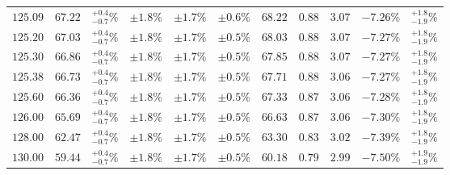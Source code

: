 \begin{table}[ht!]
{{\begin{tabular}{| cc | c | ccc | cccc | c |}
$125.09$ & $67.22$ & $^{+0.4}_{-0.7}\%$ & $\pm 1.8\%$ & {\color{black!55}$\pm 1.7\%$} & {\color{black!55}$\pm 0.6\%$} & $68.22$ & $0.88$ & $3.07$ & $-7.26\%$ & $^{+1.8}_{-1.9}\%$ \\
$125.20$ & $67.03$ & $^{+0.4}_{-0.7}\%$ & $\pm 1.8\%$ & {\color{black!55}$\pm 1.7\%$} & {\color{black!55}$\pm 0.5\%$} & $68.03$ & $0.88$ & $3.07$ & $-7.27\%$ & $^{+1.8}_{-1.9}\%$ \\
$125.30$ & $66.86$ & $^{+0.4}_{-0.7}\%$ & $\pm 1.8\%$ & {\color{black!55}$\pm 1.7\%$} & {\color{black!55}$\pm 0.5\%$} & $67.85$ & $0.88$ & $3.07$ & $-7.27\%$ & $^{+1.8}_{-1.9}\%$ \\
$125.38$ & $66.73$ & $^{+0.4}_{-0.7}\%$ & $\pm 1.8\%$ & {\color{black!55}$\pm 1.7\%$} & {\color{black!55}$\pm 0.5\%$} & $67.71$ & $0.88$ & $3.06$ & $-7.27\%$ & $^{+1.8}_{-1.9}\%$ \\
$125.60$ & $66.36$ & $^{+0.4}_{-0.7}\%$ & $\pm 1.8\%$ & {\color{black!55}$\pm 1.7\%$} & {\color{black!55}$\pm 0.5\%$} & $67.33$ & $0.87$ & $3.06$ & $-7.28\%$ & $^{+1.8}_{-1.9}\%$ \\
$126.00$ & $65.69$ & $^{+0.4}_{-0.7}\%$ & $\pm 1.8\%$ & {\color{black!55}$\pm 1.7\%$} & {\color{black!55}$\pm 0.5\%$} & $66.63$ & $0.87$ & $3.06$ & $-7.30\%$ & $^{+1.8}_{-1.9}\%$ \\
$128.00$ & $62.47$ & $^{+0.4}_{-0.7}\%$ & $\pm 1.8\%$ & {\color{black!55}$\pm 1.7\%$} & {\color{black!55}$\pm 0.5\%$} & $63.30$ & $0.83$ & $3.02$ & $-7.39\%$ & $^{+1.8}_{-1.9}\%$ \\
$130.00$ & $59.44$ & $^{+0.4}_{-0.7}\%$ & $\pm 1.8\%$ & {\color{black!55}$\pm 1.7\%$} & {\color{black!55}$\pm 0.5\%$} & $60.18$ & $0.79$ & $2.99$ & $-7.50\%$ & $^{+1.9}_{-1.9}\%$ \\
\cline{1-11}
\end{tabular}
}
}
\end{table}

\FloatBarrier
